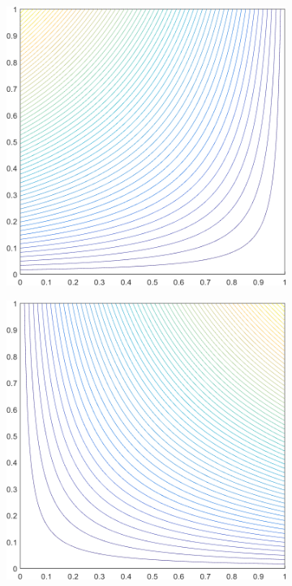 \begin{figure}
\label{fig::2D_WACHSPRESS1_unit_square_basis_functions}
\centering
	\begin{subfigure}[b]{0.39\textwidth}
		\centering
		\includegraphics[width=\textwidth]{figures/sec_BF/square_WACHSPRESS1_contour_b4.png}
		\caption{}
	\end{subfigure}
	\hspace{1.5cm}
	\begin{subfigure}[b]{0.39\textwidth}
		\centering
		\includegraphics[width=\textwidth]{figures/sec_BF/square_WACHSPRESS1_contour_b3.png}

\end{subfigure}
\end{figure}
